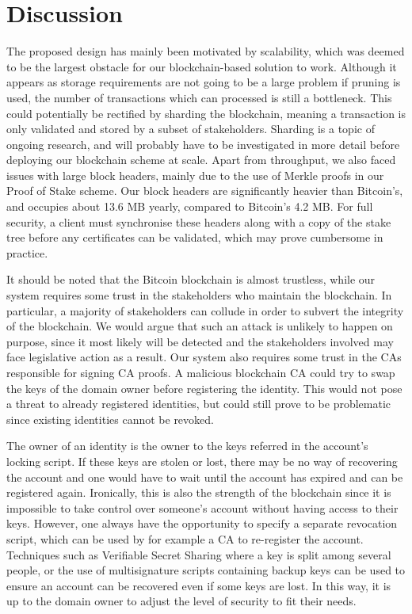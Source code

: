 \documentclass{style/kththesis}
\begin{document}
\chapter{Discussion}
\label{chap:discussion}
The proposed design has mainly been motivated by scalability, which was deemed to be the largest obstacle for our blockchain-based solution to work. Although it appears as storage requirements are not going to be a large problem if pruning is used, the number of transactions which can processed is still a bottleneck. This could potentially be rectified by sharding the blockchain, meaning a transaction is only validated and stored by a subset of stakeholders. Sharding is a topic of ongoing research, and will probably have to be investigated in more detail before deploying our blockchain scheme at scale. Apart from throughput, we also faced issues with large block headers, mainly due to the use of Merkle proofs in our Proof of Stake scheme. Our block headers are significantly heavier than Bitcoin's, and occupies about 13.6 MB yearly, compared to Bitcoin's 4.2 MB. For full security, a client must synchronise these headers along with a copy of the stake tree before any certificates can be validated, which may prove cumbersome in practice.

It should be noted that the Bitcoin blockchain is almost trustless, while our system requires some trust in the stakeholders who maintain the blockchain. In particular, a majority of stakeholders can collude in order to subvert the integrity of the blockchain. We would argue that such an attack is unlikely to happen on purpose, since it most likely will be detected and the stakeholders involved may face legislative action as a result. Our system also requires some trust in the CAs responsible for signing CA proofs. A malicious blockchain CA could try to swap the keys of the domain owner before registering the identity. This would not pose a threat to already registered identities, but could still prove to be problematic since existing identities cannot be revoked. 

The owner of an identity is the owner to the keys referred in the account's locking script. If these keys are stolen or lost, there may be no way of recovering the account and one would have to wait until the account has expired and can be registered again. Ironically, this is also the strength of the blockchain since it is impossible to take control over someone's account without having access to their keys. However, one always have the opportunity to specify a separate revocation script, which can be used by for example a CA to re-register the account. Techniques such as Verifiable Secret Sharing where a key is split among several people, or the use of multisignature scripts containing backup keys can be used to ensure an account can be recovered even if some keys are lost. In this way, it is up to the domain owner to adjust the level of security to fit their needs.
\end{document}
